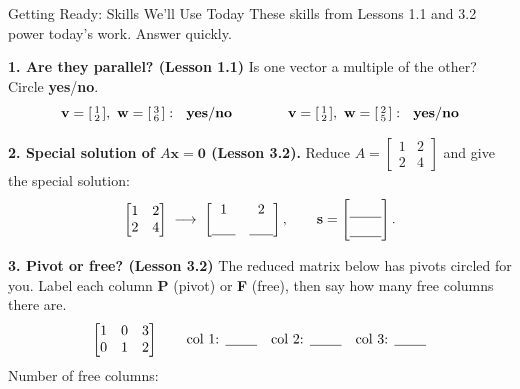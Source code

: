 \documentclass[10pt]{article}
\newcommand{\vv}{\mathbf{v}}
\newcommand{\ww}{\mathbf{w}}
\newcommand{\xx}{\mathbf{x}}
\newcommand{\svec}{\mathbf{s}}
\newcommand{\zero}{\mathbf{0}}
\begin{document}
\namedateperiod

\vspace{0.12in}

\begin{notesbox}{Getting Ready: Skills We'll Use Today}
\small These skills from Lessons 1.1 and 3.2 power today's work. Answer quickly.

\vspace{4pt}
\textbf{1. Are they parallel? (Lesson 1.1)} Is one vector a multiple of the other? Circle \textbf{yes}/\textbf{no}.
\[
  \vv=\begin{bsmallmatrix} 1\\2 \end{bsmallmatrix},\ \ww=\begin{bsmallmatrix} 3\\6 \end{bsmallmatrix}:\ \ \textbf{yes}/\textbf{no}
  \qquad\qquad
  \vv=\begin{bsmallmatrix} 1\\2 \end{bsmallmatrix},\ \ww=\begin{bsmallmatrix} 2\\5 \end{bsmallmatrix}:\ \ \textbf{yes}/\textbf{no}
\]

\vspace{4pt}
\textbf{2. Special solution of $A\xx=\zero$ (Lesson 3.2).} Reduce
$A=\begin{bmatrix} 1 & 2 \\ 2 & 4 \end{bmatrix}$ and give the special solution:
\[
  \begin{bmatrix} 1 & 2 \\ 2 & 4 \end{bmatrix}
  \;\longrightarrow\;
  \begin{bmatrix} 1 & 2 \\[2pt] \blank{0.6cm} & \blank{0.6cm} \end{bmatrix},
  \qquad
  \svec=\begin{bmatrix}\rule{0pt}{1.1em}\blank{0.8cm}\\[2pt]\blank{0.8cm}\end{bmatrix}.
\]

\vspace{4pt}
\textbf{3. Pivot or free? (Lesson 3.2)} The reduced matrix below has pivots circled for you. Label each
column \textbf{P} (pivot) or \textbf{F} (free), then say how many free columns there are.
\[
  \begin{bmatrix} 1 & 0 & 3 \\ 0 & 1 & 2 \end{bmatrix}
  \qquad
  \text{col 1: }\blank{0.8cm}\quad \text{col 2: }\blank{0.8cm}\quad \text{col 3: }\blank{0.8cm}
\]
Number of free columns: \blank{1.0cm}
\end{notesbox}
\end{document}
